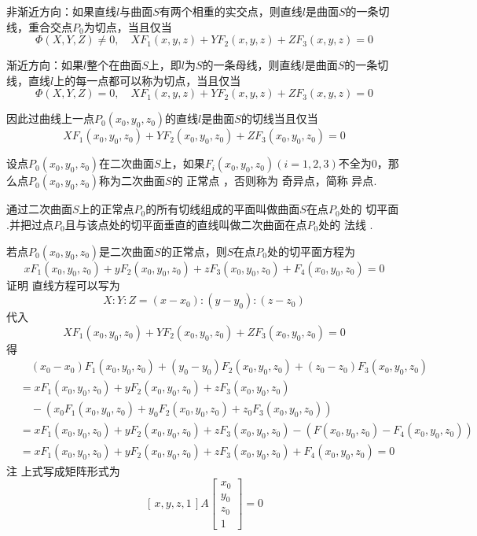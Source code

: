 非渐近方向：如果直线$l$与曲面$S$有两个相重的实交点，则直线$l$是曲面$S$的一条{\color{dy}切线}，重合交点$P_0$为{\color{dy}切点}，当且仅当
$$
\varPhi(X,Y,Z)\ne 0,\quad XF_1(x,y,z)  +YF_2(x,y,z)+ZF_3(x,y,z)=0
$$
\par 渐近方向：如果$l$整个在曲面$S$上，即$l$为$S$的一条母线，则直线$l$是曲面$S$的一条{\color{dy}切线}，直线$l$上的每一点都可以称为{\color{dy}切点}，当且仅当
$$
\varPhi(X,Y,Z) = 0,\quad XF_1(x,y,z)  +YF_2(x,y,z)+ZF_3(x,y,z)=0
$$
\par 因此过曲线上一点$P_0(x_0,y_0,z_0)$的直线$l$是曲面$S$的切线当且仅当
\begin{equation}
XF_1(x_0,y_0,z_0)  +YF_2(x_0,y_0,z_0)+ZF_3(x_0,y_0,z_0)=0
\end{equation}

设点$P_0(x_0,y_0,z_0)$在二次曲面$S$上，如果$F_i(x_0,y_0,z_0)(i=1,2,3)$不全为$0$，那么点$P_0(x_0,y_0,z_0)$称为二次曲面$S$的{\color{dy} 正常点} ，否则称为{\color{dy} 奇异点}，简称{\color{dy} 异点}.

通过二次曲面$S$上的正常点$P_0$的所有切线组成的平面叫做曲面$S$在点$P_0$处的{\color{dy} 切平面} .并把过点$P_0$且与该点处的切平面垂直的直线叫做二次曲面在点$P_0$处的{\color{dy} 法线} .

\theorem[切平面方程]
若点$P_0(x_0,y_0,z_0)$是二次曲面$S$的正常点，则$S$在点$P_0$处的切平面方程为
\begin{equation}
xF_1(x_0,y_0,z_0)  +yF_2(x_0,y_0,z_0)+zF_3(x_0,y_0,z_0)+F_4(x_0,y_0,z_0)=0
\end{equation}
{\color{dy} 证明} \kg 直线方程可以写为
$$X:Y:Z=(x-x_0):(y-y_0):(z-z_0)$$
代入
$$XF_1(x_0,y_0,z_0)  +YF_2(x_0,y_0,z_0)+ZF_3(x_0,y_0,z_0)=0$$
得
\begin{equation}
\begin{split}
&\quad (x_0-x_0)F_1(x_0,y_0,z_0)  +(y_0-y_0)F_2(x_0,y_0,z_0)+(z_0-z_0)F_3(x_0,y_0,z_0)\\
&=xF_1(x_0,y_0,z_0)  +yF_2(x_0,y_0,z_0)+zF_3(x_0,y_0,z_0)\\
&\quad -\left( x_0F_1(x_0,y_0,z_0)+y_0F_2(x_0,y_0,z_0)+z_0F_3(x_0,y_0,z_0)\right) \\
&=xF_1(x_0,y_0,z_0)  +yF_2(x_0,y_0,z_0)+zF_3(x_0,y_0,z_0)-\left( F(x_0,y_0,z_0)-F_4(x_0,y_0,z_0)\right) \\
&=xF_1(x_0,y_0,z_0)  +yF_2(x_0,y_0,z_0)+zF_3(x_0,y_0,z_0)+F_4(x_0,y_0,z_0)=0
\end{split}
\end{equation}
{\color{dy}注} \kg 上式写成矩阵形式为
\begin{equation}
\left[\,x,y,z,1\,\right] 
A
\left[ 
\begin{array}{c}
x_0 \\
y_0 \\
z_0 \\
1
\end{array}
\right] 
=0
\end{equation}

